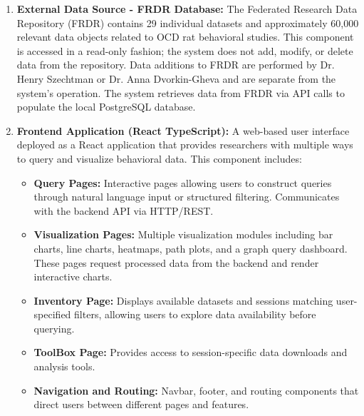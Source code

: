 \documentclass{article}
\begin{document}
\begin{enumerate}
    \item \textbf{External Data Source - FRDR Database:} The Federated Research Data Repository (FRDR) contains 29 individual datasets and approximately 60,000 relevant data objects related to OCD rat behavioral studies. This component is accessed in a read-only fashion; the system does not add, modify, or delete data from the repository. Data additions to FRDR are performed by Dr. Henry Szechtman or Dr. Anna Dvorkin-Gheva and are separate from the system's operation. The system retrieves data from FRDR via API calls to populate the local PostgreSQL database.
    
    \item \textbf{Frontend Application (React TypeScript):} A web-based user interface deployed as a React application that provides researchers with multiple ways to query and visualize behavioral data. This component includes:
        \begin{itemize}
            \item \textbf{Query Pages:} Interactive pages allowing users to construct queries through natural language input or structured filtering. Communicates with the backend API via HTTP/REST.
            \item \textbf{Visualization Pages:} Multiple visualization modules including bar charts, line charts, heatmaps, path plots, and a graph query dashboard. These pages request processed data from the backend and render interactive charts.
            \item \textbf{Inventory Page:} Displays available datasets and sessions matching user-specified filters, allowing users to explore data availability before querying.
            \item \textbf{ToolBox Page:} Provides access to session-specific data downloads and analysis tools.
            \item \textbf{Navigation and Routing:} Navbar, footer, and routing components that direct users between different pages and features.
        \end{itemize}
    

\end{enumerate}
\end{document}
